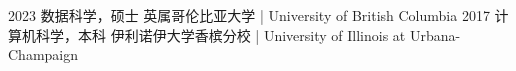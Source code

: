 \begin{experiences}

\degree
{2023}
{数据科学，硕士}
{英属哥伦比亚大学 | University of British Columbia}
\vspace{5pt}
\degree
{2017}
{计算机科学，本科}
{伊利诺伊大学香槟分校 | University of Illinois at Urbana-Champaign}

\end{experiences}
